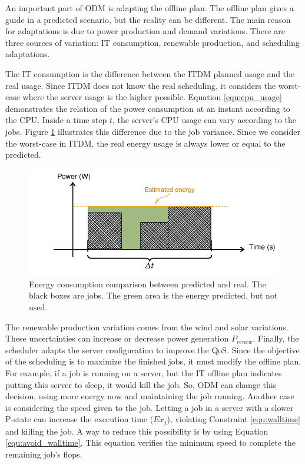 An important part of ODM is adapting the offline plan. The offline plan gives a guide in a predicted scenario, but the reality can be different. The main reason for adaptations is due to power production and demand variations. There are three sources of variation: IT consumption, renewable production, and scheduling adaptations. 

The IT consumption is the difference between the ITDM planned usage and the real usage. Since ITDM does not know the real scheduling, it considers the worst-case where the server usage is the higher possible. Equation \ref{equ:cpu_usage} demonstrates the relation of the power consumption at an instant according to the CPU. Inside a time step $t$, the server's CPU usage can vary according to the jobs. Figure \ref{fig:energy_consumption} illustrates this difference due to the job variance. Since we consider the worst-case in ITDM, the real energy usage is always lower or equal to the predicted.

\begin{figure}[!htb]
    \centering
    \includegraphics[scale=0.8]{Images/Model/energy_consumption.pdf}
    \caption[Energy consumption comparison between predicted and real.]{Energy consumption comparison between predicted and real. The black boxes are jobs. The green area is the energy predicted, but not used.}
    \label{fig:energy_consumption}
\end{figure}

The renewable production variation comes from the wind and solar variations. 
These uncertainties can increase or decrease power generation $P_{renew}$. Finally, the scheduler adapts the server configuration to improve the QoS. Since the objective of the scheduling is to maximize the finished jobs, it must modify the offline plan. For example, if a job is running on a server, but the IT offline plan indicates putting this server to sleep, it would kill the job. So, ODM can change this decision, using more energy now and maintaining the job running. Another case is considering the speed given to the job. Letting a job in a server with a slower P-state can increase the execution time ($Ex_j$), violating Constraint \ref{equ:walltime} and killing the job. A way to reduce this possibility is by using Equation \ref{equ:avoid_walltime}. This equation verifies the minimum speed to complete the remaining job's flops. 

